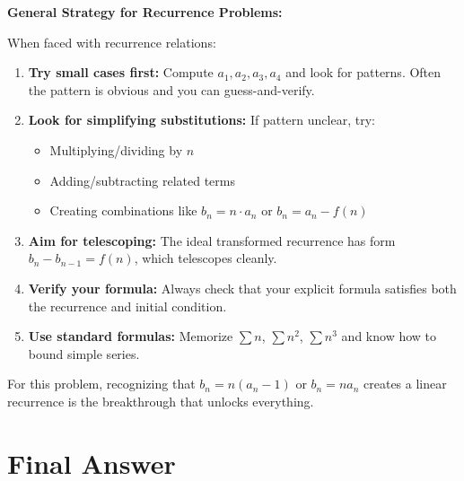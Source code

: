 \documentclass[12pt]{article}
\begin{document}
\begin{protip}
\textbf{General Strategy for Recurrence Problems:}

When faced with recurrence relations:

\begin{enumerate}
    \item \textbf{Try small cases first:} Compute $a_1, a_2, a_3, a_4$ and look for patterns. Often the pattern is obvious and you can guess-and-verify.
    
    \item \textbf{Look for simplifying substitutions:} If pattern unclear, try:
    \begin{itemize}
        \item Multiplying/dividing by $n$
        \item Adding/subtracting related terms
        \item Creating combinations like $b_n = n \cdot a_n$ or $b_n = a_n - f(n)$
    \end{itemize}
    
    \item \textbf{Aim for telescoping:} The ideal transformed recurrence has form $b_n - b_{n-1} = f(n)$, which telescopes cleanly.
    
    \item \textbf{Verify your formula:} Always check that your explicit formula satisfies both the recurrence and initial condition.
    
    \item \textbf{Use standard formulas:} Memorize $\sum n$, $\sum n^2$, $\sum n^3$ and know how to bound simple series.
\end{enumerate}

For this problem, recognizing that $b_n = n(a_n - 1)$ or $b_n = na_n$ creates a linear recurrence is the breakthrough that unlocks everything.
\end{protip}

\section{Final Answer}

\begin{center}
\Large
{}
\end{center}
\end{document}
